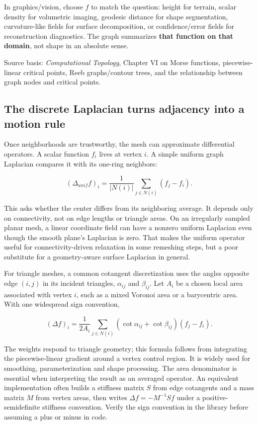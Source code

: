 In graphics/vision, choose \(f\) to match the question: height for terrain, scalar density for volumetric imaging, geodesic distance for shape segmentation, curvature-like fields for surface decomposition, or confidence/error fields for reconstruction diagnostics. The graph summarizes \textbf{that function on that domain}, not shape in an absolute sense.

Source basis: \emph{Computational Topology}, Chapter VI on Morse functions, piecewise-linear critical points, Reeb graphs/contour trees, and the relationship between graph nodes and critical points.

\subsection{The discrete Laplacian turns adjacency into a motion rule}\label{03-visual-computing-i-ch002-the-discrete-laplacian-turns-adjacency-into-a-motion-rule}

Once neighborhoods are trustworthy, the mesh can approximate differential operators. A scalar function \(f_i\) lives at vertex \(i\). A simple uniform graph Laplacian compares it with its one-ring neighbors:

\[
(\Delta_{unif}f)_i=\frac{1}{|N(i)|}\sum_{j\in N(i)}(f_j-f_i).
\]

This asks whether the center differs from its neighboring average. It depends only on connectivity, not on edge lengths or triangle areas. On an irregularly sampled planar mesh, a linear coordinate field can have a nonzero uniform Laplacian even though the smooth plane's Laplacian is zero. That makes the uniform operator useful for connectivity-driven relaxation in some remeshing steps, but a poor substitute for a geometry-aware surface Laplacian in general.

For triangle meshes, a common cotangent discretization uses the angles opposite edge \((i,j)\) in its incident triangles, \(\alpha_{ij}\) and \(\beta_{ij}\). Let \(A_i\) be a chosen local area associated with vertex \(i\), such as a mixed Voronoi area or a barycentric area. With one widespread sign convention,

\[
(\Delta f)_i=\frac{1}{2A_i}\sum_{j\in N(i)}(\cot\alpha_{ij}+\cot\beta_{ij})(f_j-f_i).
\]

The weights respond to triangle geometry; this formula follows from integrating the piecewise-linear gradient around a vertex control region. It is widely used for smoothing, parameterization and shape processing. The area denominator is essential when interpreting the result as an averaged operator. An equivalent implementation often builds a stiffness matrix \(S\) from edge cotangents and a mass matrix \(M\) from vertex areas, then writes \(\Delta f=-M^{-1}Sf\) under a positive-semidefinite stiffness convention. Verify the sign convention in the library before assuming a plus or minus in code.

